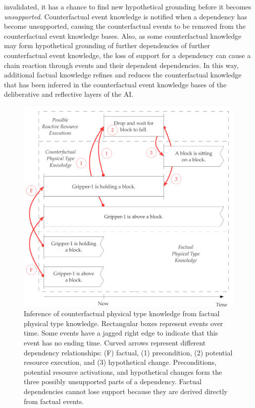 invalidated, it has a chance to find new hypothetical grounding before
it becomes \emph{unsupported}.  Counterfactual event knowledge is
notified when a dependency has become unsupported, causing the
counterfactual events to be removed from the counterfactual event
knowledge bases.  Also, as some counterfactual knowledge may form
hypothetical grounding of further dependencies of further
counterfactual event knowledge, the loss of support for a dependency
can cause a chain reaction through events and their dependent
dependencies.  In this way, additional factual knowledge refines and
reduces the counterfactual knowledge that has been inferred in the
counterfactual event knowledge bases of the deliberative and
reflective layers of the AI.
\begin{figure}[h]
\centering
\includegraphics[width=12cm]{gfx/inference_of_physical_knowledge}
\caption[Inference of counterfactual physical type knowledge from
  factual physical type knowledge.]{Inference of counterfactual
  physical type knowledge from factual physical type knowledge.
  Rectangular boxes represent events over time.  Some events have a
  jagged right edge to indicate that this event has no ending time.
  Curved arrows represent different dependency relationships: (F)
  factual, (1) precondition, (2) potential resource execution, and (3)
  hypothetical change.  Preconditions, potential resource activations,
  and hypothetical changes form the three possibly unsupported parts
  of a dependency.  Factual dependencies cannot lose support because
  they are derived directly from factual events.}
\label{figure:inference_of_physical_knowledge}
\end{figure}
